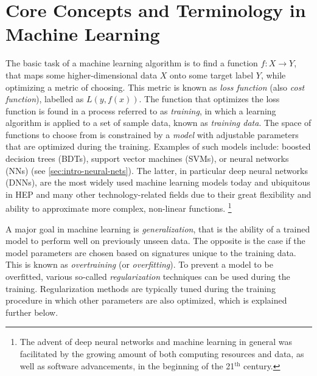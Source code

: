 \section{Core Concepts and Terminology in Machine Learning}
The basic task of a machine learning algorithm is to find a function $f: X \rightarrow Y$, that maps some higher-dimensional data $X$ onto some target label $Y$, while optimizing a metric of choosing.
This metric is known as \emph{loss function} (also \emph{cost function}), labelled as $L(y, f(x))$.
The function that optimizes the loss function is found in a process referred to as \emph{training}, in which a learning algorithm is applied to a set of sample data, known as \emph{training data}.
The space of functions to choose from is constrained by a \emph{model} with adjustable parameters that are optimized during the training. Examples of such models include: boosted decision trees (BDTs), support vector machines (SVMs), or neural networks (NNs) (see \cref{sec:intro-neural-nets}). The latter, in particular deep neural networks (DNNs), are the most widely used machine learning models today and ubiquitous in HEP and many other technology-related fields due to their great flexibility and ability to approximate more complex, non-linear functions.  \footnote{The advent of deep neural networks and machine learning in general was facilitated by the growing amount of both computing resources and data, as well as software advancements, in the beginning of the 21$^{\text{th}}$ century.}



A major goal in machine learning is \emph{generalization}, that is the ability of a trained model to perform well on previously unseen data.
The opposite is the case if the model parameters are chosen based on signatures unique to the training data. This is known as \emph{overtraining} (or \emph{overfitting}). To prevent a model to be overfitted, various so-called \emph{regularization} techniques can be used during the training.
Regularization methods are typically tuned during the training procedure in which other parameters are also optimized, which is explained further below.



